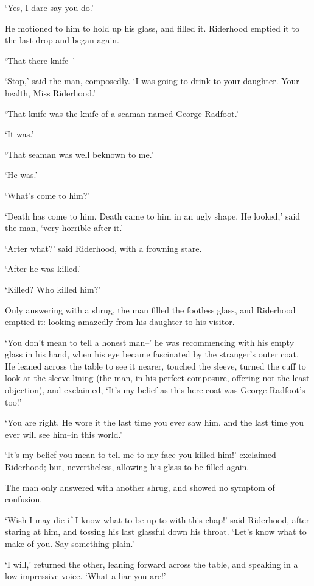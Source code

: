 ‘Yes, I dare say you do.’

He motioned to him to hold up his glass, and filled it. Riderhood
emptied it to the last drop and began again.

‘That there knife--’

‘Stop,’ said the man, composedly. ‘I was going to drink to your
daughter. Your health, Miss Riderhood.’

‘That knife was the knife of a seaman named George Radfoot.’

‘It was.’

‘That seaman was well beknown to me.’

‘He was.’

‘What’s come to him?’

‘Death has come to him. Death came to him in an ugly shape. He looked,’
said the man, ‘very horrible after it.’

‘Arter what?’ said Riderhood, with a frowning stare.

‘After he was killed.’

‘Killed? Who killed him?’

Only answering with a shrug, the man filled the footless glass, and
Riderhood emptied it: looking amazedly from his daughter to his visitor.

‘You don’t mean to tell a honest man--’ he was recommencing with
his empty glass in his hand, when his eye became fascinated by the
stranger’s outer coat. He leaned across the table to see it nearer,
touched the sleeve, turned the cuff to look at the sleeve-lining (the
man, in his perfect composure, offering not the least objection), and
exclaimed, ‘It’s my belief as this here coat was George Radfoot’s too!’

‘You are right. He wore it the last time you ever saw him, and the last
time you ever will see him--in this world.’

‘It’s my belief you mean to tell me to my face you killed him!’
exclaimed Riderhood; but, nevertheless, allowing his glass to be filled
again.

The man only answered with another shrug, and showed no symptom of
confusion.

‘Wish I may die if I know what to be up to with this chap!’ said
Riderhood, after staring at him, and tossing his last glassful down his
throat. ‘Let’s know what to make of you. Say something plain.’

‘I will,’ returned the other, leaning forward across the table, and
speaking in a low impressive voice. ‘What a liar you are!’

